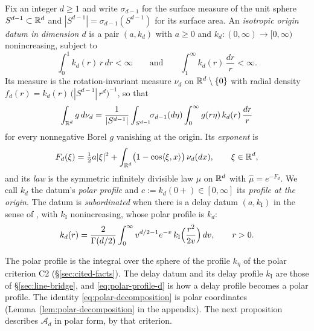 \begin{definition}\label{def:isotropic-origin-datum}
Fix an integer $d \ge 1$ and write $\sigma_{d-1}$ for the surface measure of the unit sphere
$S^{d-1} \subset \mathbb{R}^d$ and $|S^{d-1}| = \sigma_{d-1}(S^{d-1})$ for its surface area. An
\emph{isotropic origin datum in dimension $d$} is a pair
$(a, k_d)$ with $a \ge 0$ and $k_d : (0,\infty) \to [0,\infty)$ nonincreasing, subject to
\[
  \int_0^1 k_d(r)\,r\,dr < \infty
  \qquad\text{and}\qquad
  \int_1^\infty k_d(r)\,\frac{dr}{r} < \infty .
\]
Its \Levy{} measure is the rotation-invariant measure $\nu_d$ on $\mathbb{R}^d \setminus \{0\}$ with radial
density $f_d(r) = k_d(r)\,\bigl(|S^{d-1}|\,r^d\bigr)^{-1}$, so that
\begin{equation}\label{eq:polar-decomposition}
  \int_{\mathbb{R}^d} g \,d\nu_d
   = \frac{1}{|S^{d-1}|}\int_{S^{d-1}}\!\!\sigma_{d-1}(d\eta)\int_0^\infty g(r\eta)\,k_d(r)\,\frac{dr}{r}
\end{equation}
for every nonnegative Borel $g$ vanishing at the origin. Its \emph{exponent} is
\begin{equation}\label{eq:isotropic-exponent}
  F_d(\xi) = \tfrac12 a|\xi|^2
   + \int_{\mathbb{R}^d}\bigl(1 - \cos\langle \xi, x\rangle\bigr)\,\nu_d(dx), \qquad \xi \in \mathbb{R}^d ,
\end{equation}
and its \emph{law} is the symmetric infinitely divisible law $\mu$ on $\mathbb{R}^d$ with
$\widehat\mu = e^{-F_d}$. We call $k_d$ the datum's \emph{polar profile} and
$c := k_d(0{+}) \in [0,\infty]$ its \emph{profile at the origin}. The datum is
\emph{subordinated} when there is a delay datum $(a, k_{\mathrm I})$ in the sense of
, with $k_{\mathrm I}$ nonincreasing, whose polar profile  is $k_d$:
\begin{equation}\label{eq:polar-profile-d}
  k_d(r) = \frac{2}{\Gamma(d/2)}\int_0^\infty v^{d/2-1}e^{-v}\,
    k_{\mathrm I}\Bigl(\frac{r^2}{2v}\Bigr)\,dv , \qquad r > 0 .
\end{equation}
\end{definition}

The polar profile is the integral over the sphere of the profile $k_\eta$ of the polar
criterion C2 (\S\ref{sec:cited-facts}). The delay datum and its delay profile $k_{\mathrm I}$
are those of \S\ref{sec:line-bridge}, and \ref{eq:polar-profile-d} is how a delay profile
becomes a polar profile. The identity \ref{eq:polar-decomposition} is polar coordinates
(Lemma~\ref{lem:polar-decomposition} in the appendix). The next proposition describes
$\mathcal{A}_d$ in polar form, by that criterion.

